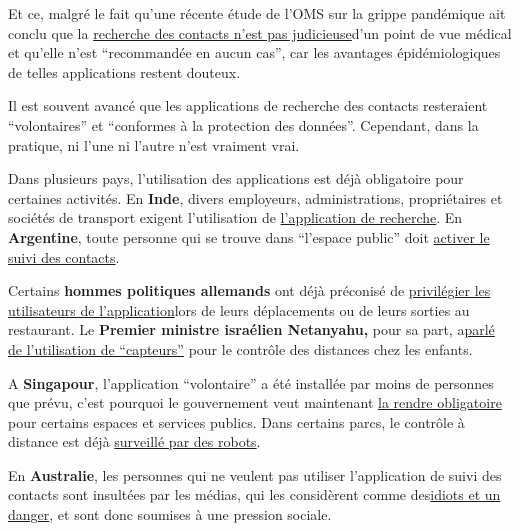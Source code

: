 Et ce, malgré le fait qu'une récente étude de l'OMS sur la grippe
pandémique ait conclu que la
\href{https://apps.who.int/iris/bitstream/handle/10665/329438/9789241516839-eng.pdf}{recherche
des contacts n'est pas judicieuse}d'un point de vue médical et qu'elle
n'est ``recommandée en aucun cas'', car les avantages épidémiologiques
de telles applications restent douteux.

Il est souvent avancé que les applications de recherche des contacts
resteraient ``volontaires'' et ``conformes à la protection des
données''. Cependant, dans la pratique, ni l'une ni l'autre n'est
vraiment vrai.

Dans plusieurs pays, l'utilisation des applications est déjà obligatoire
pour certaines activités. En \textbf{Inde}, divers employeurs,
administrations, propriétaires et sociétés de transport exigent
l'utilisation de
\href{https://www.technologyreview.com/2020/05/07/1001360/india-aarogya-setu-covid-app-mandatory/}{l'application
de recherche}. En \textbf{Argentine}, toute personne qui se trouve dans
``l'espace public'' doit
\href{https://www.heise.de/tp/features/CuidAR-Argentinien-ueberwacht-mit-einer-App-4720143.html}{activer
le suivi des contacts}.

Certains \textbf{hommes politiques allemands} ont déjà préconisé de
\href{https://www.faz.net/aktuell/politik/wer-die-corona-app-hat-soll-zuerst-wieder-ins-restaurant-duerfen-16759932.html}{privilégier
les utilisateurs de l'application}lors de leurs déplacements ou de leurs
sorties au restaurant. Le \textbf{Premier ministre israélien Netanyahu,}
pour sa part,
a\href{https://norberthaering.de/die-regenten-der-welt/netanyahu-sensoren/}{parlé
de l'utilisation de ``capteurs''} pour le contrôle des distances chez
les enfants.

A \textbf{Singapour}, l'application ``volontaire'' a été installée par
moins de personnes que prévu, c'est pourquoi le gouvernement veut
maintenant
\href{https://www.letemps.ch/economie/singapour-tracage-app-degenere-surveillance-masse}{la
rendre obligatoire} pour certains espaces et services publics. Dans
certains parcs, le contrôle à distance est déjà
\href{https://www.youtube.com/watch?v=2DJmIjKtVkA}{surveillé par des
robots}.

En \textbf{Australie}, les personnes qui ne veulent pas utiliser
l'application de suivi des contacts sont insultées par les médias, qui
les considèrent comme
des\href{https://www.news.com.au/world/coronavirus/australia/people-who-refuse-to-download-the-covidsafe-virus-tracing-app-are-the-new-antivaxxers/news-story/541c36fe5cdb56eb1a098b0b9a0dddcc}{idiots
et un danger}, et sont donc soumises à une pression sociale.

